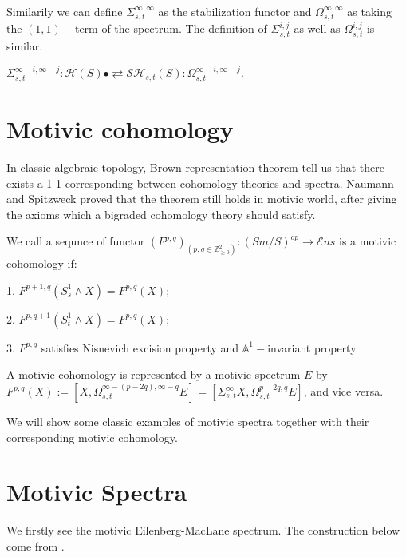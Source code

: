 Similarily we can define $  \Sigma_{s,t}^{\infty,\infty}$ as the stabilization functor and $\Omega_{s,t}^{\infty,\infty}$ as taking the $(1,1)-$term of the spectrum. The definition of $\Sigma_{s,t}^{i,j}$ as well as $\Omega_{s,t}^{i,j}$ is similar.

\begin{proposition}
    $    \Sigma_{s,t}^{\infty-i,\infty-j}: \mathcal{H}(S)\bullet \rightleftarrows \mathcal{SH}_{s,t}(S): \Omega_{s,t}^{\infty-i,\infty-j}$.
\end{proposition}

\section{Motivic cohomology}

In classic algebraic topology, Brown representation theorem tell us that there exists a 1-1 corresponding between cohomology theories and spectra. Naumann and Spitzweck proved\cite{Naumann2009BrownRI} that the theorem still holds in motivic world, after giving the axioms which a bigraded cohomology theory should satisfy.

\begin{definition}
    We call a sequnce of functor $(F^{p,q})_{(p,q\in \mathbb{Z}_{\geq 0}^2)}:(Sm/S)^{op}\to \mathcal{E}ns$ is a motivic cohomology if:

    1. $F^{p+1,q}(S_s^1\wedge X)= F^{p,q}(X)$;

    2. $F^{p,q+1}(S_t^1\wedge X)= F^{p,q}(X)$;

    3. $F^{p,q}$ satisfies Nisnevich excision property and $\mathbb{A}^1-$invariant property. 
\end{definition}

\begin{theorem}
    A motivic cohomology is represented by a motivic spectrum $E$ by $F^{p,q}(X):=[X,\Omega_{s,t}^{\infty-(p-2q),\infty-q}E]=[\Sigma_{s,t}^{\infty}X,\Omega_{s,t}^{p-2q,q}E]$, and vice versa.
\end{theorem}

We will show some classic examples of motivic spectra together with their corresponding motivic cohomology.

\section{Motivic Spectra}

We firstly see the motivic Eilenberg-MacLane spectrum. The construction below come from \textcite{dundas2007motivic}.

